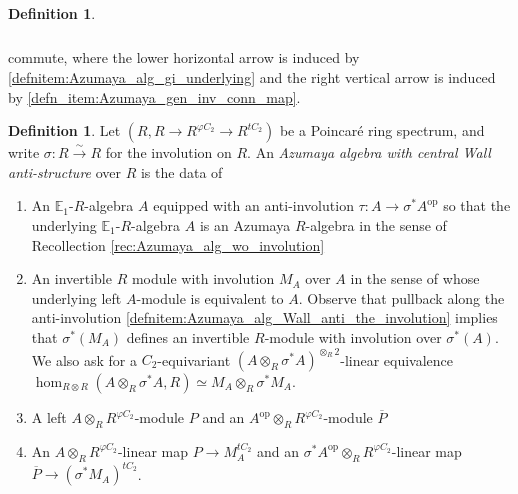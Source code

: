 \documentclass{article}
\newcommand{\EE}{\mathbb{E}}
\newcommand{\op}{\mathrm{op}} %
\theoremstyle{definition}
\newtheorem{definition}[equation]{Definition}
\begin{document}
\begin{definition}
\begin{enumerate}[label=(\alph*)]
\begin{equation*}
\begin{tikzcd}
        \end{tikzcd}    
        \end{equation*}
        commute, where the lower horizontal arrow is induced by \ref{defnitem:Azumaya_alg_gi_underlying} and the right vertical arrow is induced by \ref{defn_item:Azumaya_gen_inv_conn_map}. 
    \end{enumerate}
\end{definition}
\begin{definition}\label{defn:Azumaya_genuine_central_Wall_anti-structure}
    Let $ (R, R \to R^{\varphi C_2} \to R^{tC_2}) $ be a Poincaré ring spectrum, and write $ \sigma \colon R \xrightarrow{\sim} R $ for the involution on $ R $. 
    An \emph{Azumaya algebra with central Wall anti-structure} over $ R $ is the data of 
    \begin{enumerate}[label=(\alph*)]
        \item \label{defnitem:Azumaya_alg_Wall_anti_the_involution} An $ \EE_1 $-$ R $-algebra $ A $ equipped with an anti-involution $ \tau \colon A \to \sigma^* A^\op $ so that the underlying $ \EE_1 $-$ R $-algebra $ A $ is an Azumaya $ R $-algebra in the sense of Recollection \ref{rec:Azumaya_alg_wo_involution} 
        \item \label{defnitem:Azumaya_alg_Wall_anti_underlying} An invertible $ R $ module with involution $ M_A $ over $ A $ in the sense of \cite[Definition 3.1.4]{CDHHLMNNSI} whose underlying left $ A $-module is equivalent to $ A $. 
        Observe that pullback along the anti-involution \ref{defnitem:Azumaya_alg_Wall_anti_the_involution} implies that $ \sigma^*(M_A) $ defines an invertible $ R $-module with involution over $ \sigma^*(A) $. 
        We also ask for a $ C_2 $-equivariant $ (A \otimes_R \sigma^* A)^{\otimes_R 2} $-linear equivalence $ \hom_{R \otimes R}(A \otimes_R \sigma^* A, R) \simeq M_A \otimes_R \sigma^* M_A $. 
        \item A left $ A \otimes_{R} R^{\varphi C_2} $-module $ P $ and an $ A^\op \otimes_R R^{\varphi C_2} $-module $ \overline{P} $
        \item \label{defn_item:Azumaya_Wall_anti_inv_conn_map} An $ A \otimes_R R^{\varphi C_2} $-linear map $ P \to M_A^{tC_2} $ and an $ \sigma^* A^\op \otimes_R R^{\varphi C_2} $-linear map $ \overline{P} \to (\sigma^*M_A)^{tC_2} $. 

\end{enumerate}
\end{definition}
\end{document}
